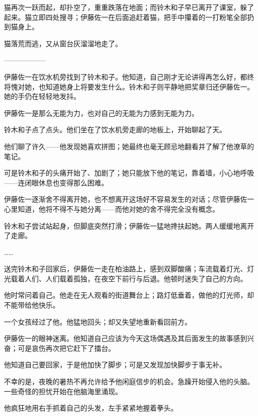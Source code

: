 猫再次一跃而起，却扑空了，重重跌落在地面；而铃木和子早已离开了课室，躲了起来。猫立即四处搜寻；伊藤佐一在后面追赶着猫，把手中攥着的一打粉笔全部扔到猫身上。


猫落荒而逃，又从窗台灰溜溜地走了。

\begin{center}
——————
\end{center}

伊藤佐一在饮水机旁找到了铃木和子。他知道，自己刚才无论讲得再怎么好，都终将愧对她，也知道她身上将要发生什么。铃木和子则平静地把奖章归还伊藤佐一。她的手仍在轻轻地发抖。

伊藤佐一是那么无能为力，也对自己的无能为力感到无能为力。

铃木和子点了点头。他们坐在了饮水机旁走廊的地板上，开始聊起了天。

他们聊了许久——他发现她喜欢拼图；她最终也毫无顾忌地翻看并了解了他潦草的笔记。

可是铃木和子的头痛开始了、加剧了；她只能放下他的笔记，靠着墙，小心地呼吸——连闭眼休息也变得那么困难。

伊藤佐一逐渐舍不得离开她，也不想离开这场好不容易发生的对话；尽管伊藤佐一心里知道，他将不得不与她分离——而他对她的舍不得完全没有概念。


铃木和子尝试站起身，但脚底突然打滑；伊藤佐一猛地搀扶起她。两人缓缓地离开了走廊。

……

送完铃木和子回家后，伊藤佐一走在柏油路上，感到双脚酸痛；车流载着灯光、灯光载着人们、人们载着孤独，在夜空下前行与后退。他顿时迷失了自己的方向。

他时常问着自己。他走在无人观看的街道舞台上；路灯低垂着，做他的灯光师，却不能带给他快乐。

一个女孩经过了他。他猛地回头；却又失望地重新看回前方。

伊藤佐一的眼神迷离。他知道自己应该为今天这场偶遇及其后面发生的故事感到兴奋；可是哀伤再次把它赶下了擂台。

他知道自己要回家，于是他加快了脚步；可是又发现加快脚步于事无补。

不幸的是，夜晚的暑热不再允许给予他闲庭信步的机会。急躁开始侵入他的头脑。一些奇怪的担忧开始在他脑海里涌现。

他疯狂地用右手抓着自己的头发，左手紧紧地握着拳头。

